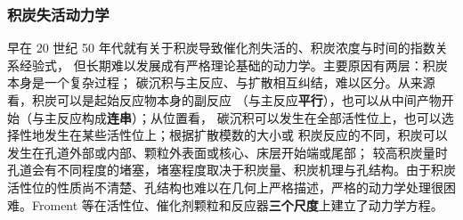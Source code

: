\subsubsection{积炭失活动力学}

早在 20 世纪 50 年代就有关于积炭导致催化剂失活的、积炭浓度与时间的指数关系经验式，
但长期难以发展成有严格理论基础的动力学。主要原因有两层：积炭本身是一个复杂过程；
碳沉积与主反应、与扩散相互纠结，难以区分。从来源看，积炭可以是起始反应物本身的副反应
（与主反应\textbf{平行}），也可以从中间产物开始（与主反应构成\textbf{连串}）；从位置看，
碳沉积可以发生在全部活性位上，也可以选择性地发生在某些活性位上；根据扩散模数的大小或
积炭反应的不同，积炭可以发生在孔道外部或内部、颗粒外表面或核心、床层开始端或尾部；
较高积炭量时孔道会有不同程度的堵塞，堵塞程度取决于积炭量、积炭机理与孔结构。由于积炭
活性位的性质尚不清楚、孔结构也难以在几何上严格描述，严格的动力学处理很困难。Froment
等在活性位、催化剂颗粒和反应器\textbf{三个尺度}上建立了动力学方程。

